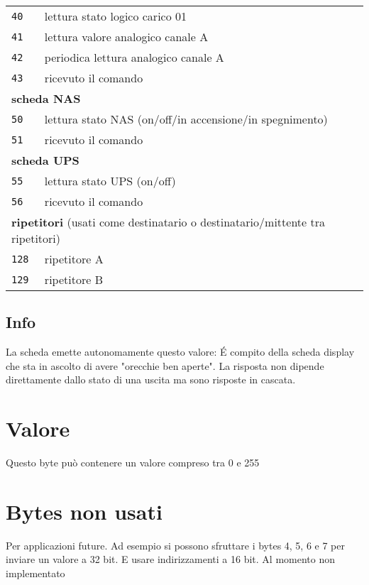 \documentclass[italian]{article}
\begin{document}
\begin{tabular}{ll}
		    \texttt{40} & lettura stato logico carico 01\\ 
		    \texttt{41} & lettura valore analogico canale A\\
		    \texttt{42} & periodica lettura analogico canale A\\
			\texttt{43} & ricevuto il comando\\
			\multicolumn{2}{l}{\textbf{scheda NAS}}\\
			\texttt{50} & lettura stato NAS (on/off/in accensione/in spegnimento)\\
			\texttt{51} & ricevuto il comando\\
			\multicolumn{2}{l}{\textbf{scheda UPS}}\\
			\texttt{55} & lettura stato UPS (on/off)\\
			\texttt{56} & ricevuto il comando\\
			\multicolumn{2}{l}{\textbf{ripetitori} (usati come destinatario o destinatario/mittente tra ripetitori)}\\
			\texttt{128} & ripetitore A\\    
			\texttt{129} & ripetitore B\\ 
        \end{tabular}

    \subsection*{Info}
    
    La scheda emette autonomamente questo valore: \'E compito della scheda display che sta in ascolto di avere "orecchie ben aperte". La risposta non dipende direttamente dallo stato di una uscita ma sono risposte in cascata.
    
    \section*{Valore}
    
    Questo byte può contenere un valore compreso tra 0 e 255
    
    \section*{Bytes non usati}
    
    Per applicazioni future. Ad esempio si possono sfruttare i bytes 4, 5, 6 e 7 per inviare un valore a 32 bit. E usare indirizzamenti a 16 bit. Al momento non implementato
    
\end{document}
